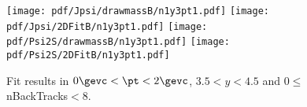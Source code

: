 \begin{figure}[H]
\begin{center}
\texttt{[image: pdf/Jpsi/drawmassB/n1y3pt1.pdf]}
\texttt{[image: pdf/Jpsi/2DFitB/n1y3pt1.pdf]}
\vspace*{-0.5cm}
\texttt{[image: pdf/Psi2S/drawmassB/n1y3pt1.pdf]}
\texttt{[image: pdf/Psi2S/2DFitB/n1y3pt1.pdf]}
\vspace*{-0.5cm}
\end{center}
\caption{Fit results in $0\gevc<\pt<2\gevc$, $3.5<y<4.5$ and 0$\leq$nBackTracks$<$8.}
\label{Fitn1y3pt1}
\end{figure}
